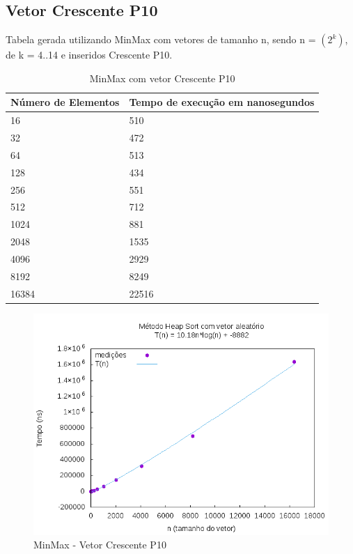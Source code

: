 \documentclass[12pt,a4paper,twoside]{report}
\begin{document}
\subsection{Vetor Crescente P10}
Tabela gerada utilizando MinMax com vetores de tamanho n, sendo n = $(2^k)$, de k = 4..14 e inseridos Crescente P10.
\begin{table}[H]
\centering
\caption{MinMax com vetor Crescente P10}
\label{my-label}
\begin{tabular}{|l|l|}
\hline
\multicolumn{1}{|c|}{\textbf{Número de Elementos}} & \multicolumn{1}{c|}{\textbf{Tempo de execução em nanosegundos}} \\ \hline
16 & 510 \\ \hline
32 & 472 \\ \hline
64 & 513 \\ \hline
128 & 434 \\ \hline
256 & 551 \\ \hline
512 & 712 \\ \hline
1024 & 881 \\ \hline
2048 & 1535 \\ \hline
4096 & 2929 \\ \hline
8192 & 8249 \\ \hline
16384 & 22516 \\ \hline
\end{tabular}
\end{table}

\begin{figure}[H]
    \centering
    \includegraphics[width=0.7\linewidth]{graficos/HeapSort/vIntAleatorio/vIntAleatorio.png}
  \caption{MinMax - Vetor Crescente P10}
\end{figure}
\end{document}

